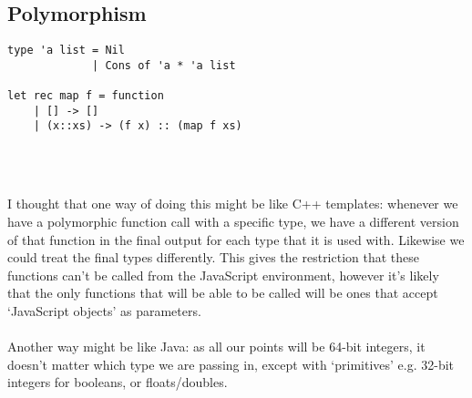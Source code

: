 \documentclass{article}
\begin{document}
\subsection{Polymorphism}
\begin{minipage}{0.4\linewidth}
\begin{verbatim}
type 'a list = Nil
             | Cons of 'a * 'a list

let rec map f = function
    | [] -> []
    | (x::xs) -> (f x) :: (map f xs)
\end{verbatim}
\end{minipage}  
\begin{minipage}{0.6\linewidth}
\begin{verbatim}

\end{verbatim}
\end{minipage}
\\\\
I thought that one way of doing this might be like C++ templates: whenever we have a polymorphic function call with a specific type, we have a different version of that function in the final output for each type that it is used with. Likewise we could treat the final types differently. This gives the restriction that these functions can't be called from the JavaScript environment, however it's likely that the only functions that will be able to be called will be ones that accept `JavaScript objects' as parameters.
\\\\
Another way might be like Java: as all our points will be 64-bit integers, it doesn't matter which type we are passing in, except with `primitives' e.g. 32-bit integers for booleans, or floats/doubles.
\end{document}
